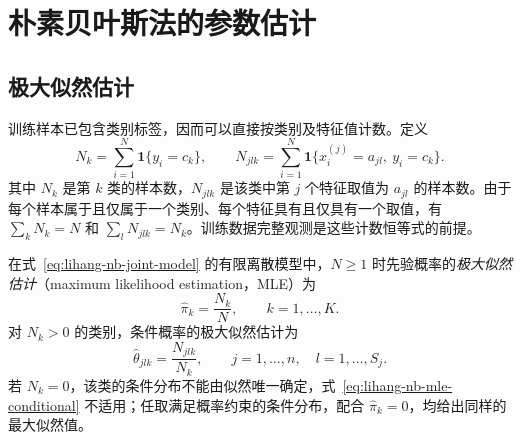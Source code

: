 \section{朴素贝叶斯法的参数估计}
\label{sec:lihang-nb-parameter-estimation}

\subsection{极大似然估计}
\label{subsec:lihang-nb-mle}

训练样本已包含类别标签，因而可以直接按类别及特征值计数。定义
\begin{equation}
\label{eq:lihang-nb-counts}
    N_k=\sum_{i=1}^{N}\mathbf{1}\{y_i=c_k\},\qquad
    N_{jlk}=\sum_{i=1}^{N}\mathbf{1}\{x_i^{(j)}=a_{jl},\ y_i=c_k\}.
\end{equation}
其中 $N_k$ 是第 $k$ 类的样本数，$N_{jlk}$ 是该类中第 $j$ 个特征取值为 $a_{jl}$ 的样本数。由于每个样本属于且仅属于一个类别、每个特征具有且仅具有一个取值，有 $\sum_k N_k=N$ 和 $\sum_l N_{jlk}=N_k$。训练数据完整观测是这些计数恒等式的前提。

\begin{proposition}
\label{prop:lihang-nb-mle}
在式~\eqref{eq:lihang-nb-joint-model} 的有限离散模型中，$N\geq1$ 时先验概率的\emph{极大似然估计}（maximum likelihood estimation，MLE）为
\begin{equation}
\label{eq:lihang-nb-mle-prior}
    \widehat\pi_k=\frac{N_k}{N},\qquad k=1,\ldots,K.
\end{equation}
对 $N_k>0$ 的类别，条件概率的极大似然估计为
\begin{equation}
\label{eq:lihang-nb-mle-conditional}
    \widehat\theta_{jlk}=\frac{N_{jlk}}{N_k},\qquad
    j=1,\ldots,n,\quad l=1,\ldots,S_j.
\end{equation}
若 $N_k=0$，该类的条件分布不能由似然唯一确定，式~\eqref{eq:lihang-nb-mle-conditional} 不适用；任取满足概率约束的条件分布，配合 $\widehat\pi_k=0$，均给出同样的最大似然值。
\end{proposition}

